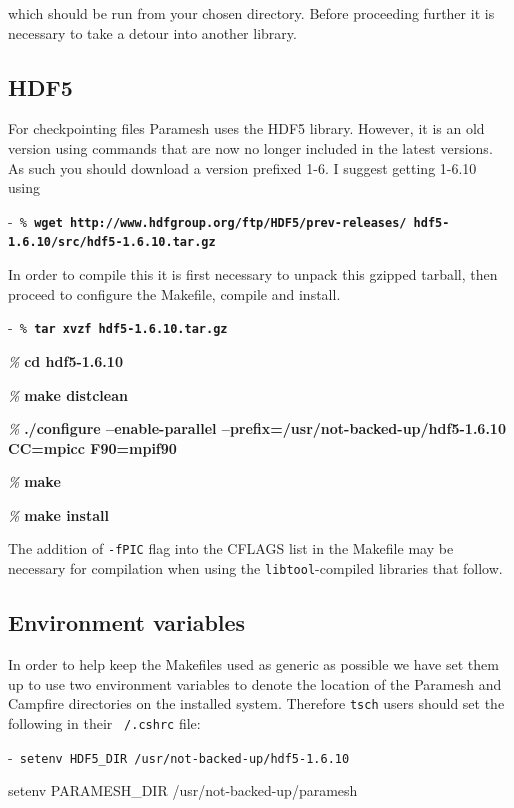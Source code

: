 \documentclass[paper=a4, fontsize=11pt,twoside,bibtotoc]{scrartcl}		%
\newenvironment{codebox}{\begin{center}\begin{MakeFramed}{\hsize0.99\linewidth\advance\hsize-\width\FrameRestore}\tt}{\end{MakeFramed}\end{center}}
\newcommand{\prompt}[1]{\textsl{\%} \textbf{#1}}
\begin{document}
\noindent which should be run from your chosen directory.  Before proceeding further it is necessary to take a detour into another library.

\subsection{HDF5}

For checkpointing files Paramesh uses the HDF5 library.  However, it is an old version using commands 
that are now no longer included in the latest versions.  As such you should download a version prefixed 1-6.  I suggest getting 1-6.10 using

\begin{codebox}
	\prompt{wget http://www.hdfgroup.org/ftp/HDF5/prev-releases/ hdf5-1.6.10/src/hdf5-1.6.10.tar.gz}
\end{codebox}

In order to compile this it is first necessary to unpack this gzipped tarball, then proceed to configure the Makefile, compile and install.  

\begin{codebox}
	\prompt{tar xvzf hdf5-1.6.10.tar.gz}

	\prompt{cd hdf5-1.6.10}

        \prompt{make distclean}

        \prompt{./configure --enable-parallel --prefix=/usr/not-backed-up/hdf5-1.6.10 CC=mpicc F90=mpif90}

        \prompt{make}

        \prompt{make install}
\end{codebox}

The addition of \texttt{-fPIC} flag into the CFLAGS list in the Makefile may be necessary for compilation when using the \texttt{libtool}-compiled libraries that 
follow.

\subsection{Environment variables}

In order to help keep the Makefiles used as generic as possible we have set them up to use two environment variables to denote the location of the Paramesh and 
Campfire directories on the installed system.  Therefore \texttt{tsch} users should set the following in their \texttt{~/.cshrc} file:

\begin{codebox}
       	setenv HDF5\_DIR /usr/not-backed-up/hdf5-1.6.10

        setenv PARAMESH\_DIR /usr/not-backed-up/paramesh
\end{codebox}
\end{document}
